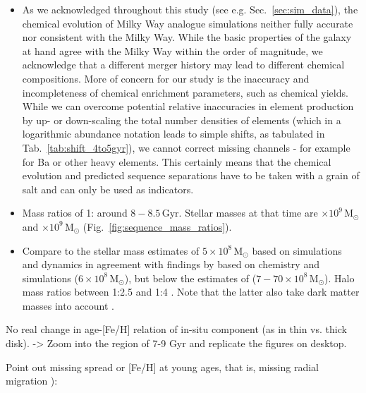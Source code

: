 \documentclass[fleqn,usenatbib]{mnras}
\begin{document}
\begin{itemize}
    \item As we acknowledged throughout this study (see e.g. Sec.~\ref{sec:sim_data}), the chemical evolution of Milky Way analogue simulations neither fully accurate nor consistent with the Milky Way. While the basic properties of the galaxy at hand agree with the Milky Way within the order of magnitude, we acknowledge that a different merger history may lead to different chemical compositions. More of concern for our study is the inaccuracy and incompleteness of chemical enrichment parameters, such as chemical yields. While we can overcome potential relative inaccuracies in element production by up- or down-scaling the total number densities of elements (which in a logarithmic abundance notation leads to simple shifts, as tabulated in Tab.~\ref{tab:shift_4to5gyr}), we cannot correct missing channels - for example for Ba or other heavy elements. This certainly means that the chemical evolution and predicted sequence separations have to be taken with a grain of salt and can only be used as indicators.
    \item Mass ratios of 1: around $8-8.5\,\mathrm{Gyr}$. Stellar masses at that time are $\times10^9\,\mathrm{M_\odot}$ and $\times10^9\,\mathrm{M_\odot}$
    (Fig.~\ref{fig:sequence_mass_ratios}).
    \item Compare to the stellar mass estimates of $5\times10^{8}\,\mathrm{M_\odot}$ based on simulations and dynamics \citep{Naidu2021} in agreement with findings by \citet{Helmi2018} based on chemistry and simulations ($6\times 10^{8}\,\mathrm{M_\odot}$), but below the estimates of \citet{Feuillet2020} ($7-70\times10^{8}\,\mathrm{M_\odot}$). Halo mass ratios between 1:2.5 \citep{Naidu2020} and 1:4 \citep{Helmi2018}. Note that the latter also take dark matter masses into account \citep[e.g. $2\times10^{11}\,\mathrm{M_\odot}$ for][]{Naidu2020}.
\end{itemize}



No real change in age-[Fe/H] relation of in-situ component (as in thin vs. thick disk). 
-> Zoom into the region of 7-9 Gyr and replicate the figures on desktop.

Point out missing spread or [Fe/H] at young ages, that is, missing radial migration \citep{}):

\cite{Minchev2010}
\end{document}

